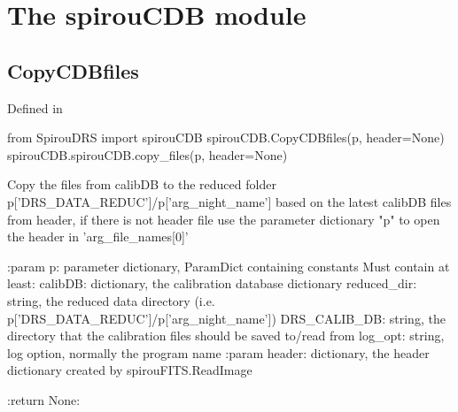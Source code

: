 
\clearpage
\newpage
\begin{minipage}{\textwidth}
\section{The spirouCDB module}
\label{ch:the_module:spirouCDB}

\subsection{CopyCDBfiles}

Defined in \spirouCDB{}

\begin{pythonbox}
from SpirouDRS import spirouCDB
spirouCDB.CopyCDBfiles(p, header=None)
spirouCDB.spirouCDB.copy_files(p, header=None)
\end{pythonbox}

\begin{pythondocstring}
Copy the files from calibDB to the reduced folder
   p['DRS_DATA_REDUC']/p['arg_night_name']
based on the latest calibDB files from header, if there is not header file
use the parameter dictionary "p" to open the header in 'arg_file_names[0]'

:param p: parameter dictionary, ParamDict containing constants
    Must contain at least:
            calibDB: dictionary, the calibration database dictionary
            reduced_dir: string, the reduced data directory
                         (i.e. p['DRS_DATA_REDUC']/p['arg_night_name'])
            DRS_CALIB_DB: string, the directory that the calibration
                          files should be saved to/read from
            log_opt: string, log option, normally the program name
:param header: dictionary, the header dictionary created by
               spirouFITS.ReadImage

:return None:
\end{pythondocstring}
\end{minipage}

